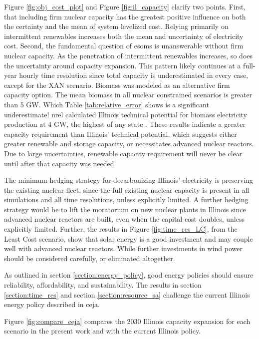 Figure \ref{fig:obj_cost_plot} and Figure \ref{fig:il_capacity} clarify
two points. First, that including firm nuclear capacity has the greatest positive
influence on both the certainty and the mean of system levelized cost. Relying primarily
on intermittent renewables increases both the mean and uncertainty of electricity cost.
Second, the fundamental question of \glspl{esom} is unanswerable without firm nuclear capacity.
As the penetration of intermittent renewables increases, so does the uncertainty around
capacity expansion. This pattern likely continues at a full-year hourly time resolution
since total capacity is underestimated in every case, except for the XAN scenario.
Biomass was modeled as an alternative firm capacity option. The mean biomass in all
nuclear constrained scenarios is greater than 5 GW. Which Table \ref{tab:relative_error}
shows is a significant underestimate! \gls{nrel} calculated Illinois technical potential
for biomass electricity production at 4 GW, the highest of any state \cite{lopez_us_2012}.
These results indicate a greater capacity requirement than Illinois' technical potential,
which suggests either greater renewable and storage capacity, or necessitates advanced
nuclear reactors. Due to large uncertainties, renewable capacity requirement
will never be clear until after that capacity was needed.

The minimum hedging strategy for decarbonizing Illinois' electricity is preserving
the existing nuclear fleet, since the full existing nuclear capacity is present
in all simulations and all time resolutions, unless explicitly limited. A further
hedging strategy would be to lift the moratorium on new nuclear plants in Illinois
since advanced nuclear reactors are built, even when the capital cost doubles, unless
explicitly limited. Further, the results in Figure \ref{fig:time_res_LC}, from the
Least Cost scenario, show that solar energy is a good investment and may couple well
with advanced nuclear reactors. While further investments in wind power should be
considered carefully, or eliminated altogether.

As outlined in section \ref{section:energy_policy}, good energy policies should
ensure reliability, affordability, and sustainability. The results in section
\ref{section:time_res} and section \ref{section:resource_sa} challenge the
current Illinois energy policy described in \gls{ceja}.

Figure \ref{fig:compare_ceja} compares the 2030 Illinois capacity expansion
for each scenario in the present work and with the current Illinois policy.

